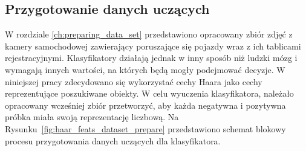 \subsection{Przygotowanie danych uczących}
\label{subsec:przygotowanie-danych-uczacych}
W rozdziale \ref{ch:preparing_data_set} przedstawiono opracowany zbiór zdjęć z kamery samochodowej zawierający poruszające się pojazdy wraz z ich tablicami rejestracyjnymi.
Klasyfikatory działają jednak w inny sposób niż ludzki mózg i wymagają innych wartości, na których będą mogły podejmować decyzje.
W niniejszej pracy zdecydowano się wykorzystać cechy Haara jako cechy reprezentujące poszukiwane obiekty.
W celu wyuczenia klasyfikatora, należało opracowany wcześniej zbiór przetworzyć, aby każda negatywna i pozytywna próbka miała swoją reprezentację liczbową.
Na Rysunku~\ref{fig:haar_feats_dataset_prepare} przedstawiono schemat blokowy procesu przygotowania danych uczących dla klasyfikatora.

